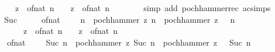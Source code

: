 \begin{isabellebody}
\ \ \ \ \ \ {\isacharparenleft}{\kern0pt}{}\ {\isacharasterisk}{\kern0pt}\ {\isacharparenleft}{\kern0pt}z\ {\isacharplus}{\kern0pt}\ of{\isacharunderscore}{\kern0pt}nat\ n{\isacharparenright}{\kern0pt}{\isacharparenright}{\kern0pt}\ {\isacharasterisk}{\kern0pt}\ {\isacharparenleft}{\kern0pt}{}\ {\isacharasterisk}{\kern0pt}\ {\isacharparenleft}{\kern0pt}z\ {\isacharplus}{\kern0pt}\ of{\isacharunderscore}{\kern0pt}nat\ n{\isacharparenright}{\kern0pt}\ {\isacharplus}{\kern0pt}\ {}{\isacharparenright}{\kern0pt}{\isachardoublequoteclose}\isanewline
\ \ \ \ \isamarkupfalse%
\ {\isacharparenleft}{\kern0pt}simp\ add{\isacharcolon}{\kern0pt}\ pochhammer{\isacharunderscore}{\kern0pt}rec{\isacharprime}{\kern0pt}\ ac{\isacharunderscore}{\kern0pt}simps{\isacharparenright}{\kern0pt}\isanewline
\ \ \isamarkupfalse%
\ \isamarkupfalse%
\ Suc\isanewline
\ \ \isamarkupfalse%
\ \isamarkupfalse%
\ {\isachardoublequoteopen}of{\isacharunderscore}{\kern0pt}nat\ {\isacharparenleft}{\kern0pt}{}\ {\isacharcircum}{\kern0pt}\ {\isacharparenleft}{\kern0pt}{}\ {\isacharasterisk}{\kern0pt}\ n{\isacharparenright}{\kern0pt}{\isacharparenright}{\kern0pt}\ {\isacharasterisk}{\kern0pt}\ pochhammer\ z\ n\ {\isacharasterisk}{\kern0pt}\ pochhammer\ {\isacharparenleft}{\kern0pt}z\ {\isacharplus}{\kern0pt}\ {}{\isacharslash}{\kern0pt}{}{\isacharparenright}{\kern0pt}\ n\ {\isacharasterisk}{\kern0pt}\isanewline
\ \ \ \ \ \ \ \ {\isacharparenleft}{\kern0pt}{}\ {\isacharasterisk}{\kern0pt}\ {\isacharparenleft}{\kern0pt}z\ {\isacharplus}{\kern0pt}\ of{\isacharunderscore}{\kern0pt}nat\ n{\isacharparenright}{\kern0pt}{\isacharparenright}{\kern0pt}\ {\isacharasterisk}{\kern0pt}\ {\isacharparenleft}{\kern0pt}{}\ {\isacharasterisk}{\kern0pt}\ {\isacharparenleft}{\kern0pt}z\ {\isacharplus}{\kern0pt}\ of{\isacharunderscore}{\kern0pt}nat\ n{\isacharparenright}{\kern0pt}\ {\isacharplus}{\kern0pt}\ {}{\isacharparenright}{\kern0pt}\ {\isacharequal}{\kern0pt}\isanewline
\ \ \ \ \ \ of{\isacharunderscore}{\kern0pt}nat\ {\isacharparenleft}{\kern0pt}{}\ {\isacharcircum}{\kern0pt}\ {\isacharparenleft}{\kern0pt}{}\ {\isacharasterisk}{\kern0pt}\ {\isacharparenleft}{\kern0pt}Suc\ n{\isacharparenright}{\kern0pt}{\isacharparenright}{\kern0pt}{\isacharparenright}{\kern0pt}\ {\isacharasterisk}{\kern0pt}\ pochhammer\ z\ {\isacharparenleft}{\kern0pt}Suc\ n{\isacharparenright}{\kern0pt}\ {\isacharasterisk}{\kern0pt}\ pochhammer\ {\isacharparenleft}{\kern0pt}z\ {\isacharplus}{\kern0pt}\ {}{\isacharslash}{\kern0pt}{}{\isacharparenright}{\kern0pt}\ {\isacharparenleft}{\kern0pt}Suc\ n{\isacharparenright}{\kern0pt}{\isachardoublequoteclose}\isanewline

\end{isabellebody}
